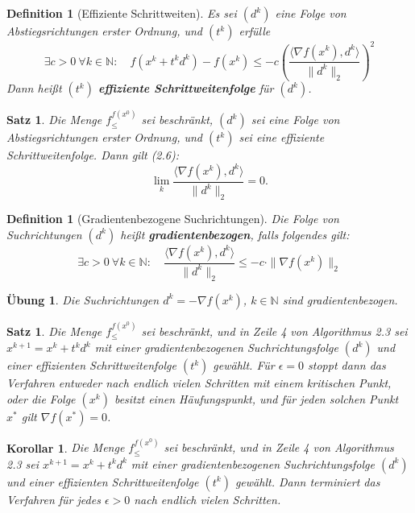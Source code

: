 \documentclass[11pt]{scrreprt}
\newcounter{thm}
\theoremstyle{thmstyle}
\numberwithin{thm}{section}
\newtheorem{definition}[thm]{Definition}
\newtheorem{korollar}[thm]{Korollar}
\newtheorem{satz}[thm]{Satz}
\newtheorem{uebung}[thm]{Übung}
\begin{document}
\setcounter{thm}{4}

\begin{definition}[Effiziente Schrittweiten]
	Es sei $(d^k)$ eine Folge von Abstiegsrichtungen erster Ordnung, und $(t^k)$ erfülle
	$$ \exists c > 0 ~\forall k \in \mathbb{N}: \quad f(x^k+ t^k d^k) - f(x^k) \leq -c \left( \frac{\langle \nabla f(x^k) , d^k \rangle}{\| d^k \|_2} \right)^2 $$
	Dann heißt $(t^k)$ \textbf{effiziente Schrittweitenfolge} für $(d^k)$.
\end{definition}

\begin{satz}
	Die Menge $f_{\leq}^{f(x^0)}$ sei beschränkt, $(d^k)$ sei eine Folge von Abstiegsrichtungen erster Ordnung, und $(t^k)$ sei eine effiziente Schrittweitenfolge. Dann gilt (2.6):
	$$ \lim_{k} \frac{\langle \nabla f(x^k), d^k \rangle}{\| d^k \|_2}	= 0. $$
\end{satz}

\begin{definition}[Gradientenbezogene Suchrichtungen]
	Die Folge von Suchrichtungen $(d^k)$ heißt \textbf{gradientenbezogen}, falls folgendes gilt:
	$$ \exists c > 0 ~\forall k \in \mathbb{N}: \quad \frac{\langle \nabla f(x^k), d^k \rangle}{\| d^k \|_2} \leq - c \cdot \| \nabla f(x^k)\|_2 $$
\end{definition}

\begin{uebung}
	Die Suchrichtungen $d^k = - \nabla f(x^k)$, $k \in \mathbb{N}$ sind gradientenbezogen.
\end{uebung}

\begin{satz}
	Die Menge $f_{\leq}^{f(x^0)}$ sei beschränkt, und in Zeile 4 von Algorithmus 2.3 sei $x^{k+1} = x^k + t^k d^k$ mit einer gradientenbezogenen Suchrichtungsfolge $(d^k)$ und einer effizienten Schrittweitenfolge $(t^k)$ gewählt. Für $\epsilon = 0$ stoppt dann das Verfahren entweder nach endlich vielen Schritten mit einem kritischen Punkt, oder die Folge $(x^k )$ besitzt einen Häufungspunkt, und für jeden solchen Punkt $x^*$ gilt $\nabla f(x^*) = 0$.	
\end{satz}

\begin{korollar}
	Die Menge $f_{\leq}^{f(x^0)}$ sei beschränkt, und in Zeile 4 von Algorithmus 2.3 sei $x^{k+1} = x^k + t^k d^k$ mit einer gradientenbezogenen Suchrichtungsfolge $(d^k)$ und einer effizienten Schrittweitenfolge $(t^k)$ gewählt. Dann terminiert das Verfahren für jedes $\epsilon > 0$ nach endlich vielen Schritten.
\end{korollar}
\end{document}
